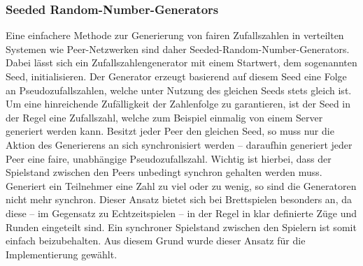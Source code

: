 \subsubsection{Seeded Random-Number-Generators}
Eine einfachere Methode zur Generierung von fairen Zufallszahlen in verteilten Systemen wie Peer-Netzwerken sind daher \glqq{}Seeded-Random-Number-Generators\grqq{}. Dabei lässt sich ein Zufallszahlengenerator mit einem Startwert, dem sogenannten \glqq{}Seed\grqq{}, initialisieren. Der Generator erzeugt basierend auf diesem Seed eine Folge an Pseudozufallszahlen, welche unter Nutzung des gleichen Seeds stets gleich ist. Um eine hinreichende Zufälligkeit der Zahlenfolge zu garantieren, ist der Seed in der Regel eine Zufallszahl, welche zum Beispiel einmalig von einem Server generiert werden kann. Besitzt jeder Peer den gleichen Seed, so muss nur die Aktion des Generierens an sich synchronisiert werden -- daraufhin generiert jeder Peer eine faire, unabhängige Pseudozufallszahl. Wichtig ist hierbei, dass der Spielstand zwischen den Peers unbedingt synchron gehalten werden muss. Generiert ein Teilnehmer eine Zahl zu viel oder zu wenig, so sind die Generatoren nicht mehr synchron. Dieser Ansatz bietet sich bei Brettspielen besonders an, da diese -- im Gegensatz zu Echtzeitspielen -- in der Regel in klar definierte \glqq{}Züge\grqq{} und \glqq{}Runden\grqq{} eingeteilt sind. Ein synchroner Spielstand zwischen den Spielern ist somit einfach beizubehalten. Aus diesem Grund wurde dieser Ansatz für die Implementierung gewählt.\par

